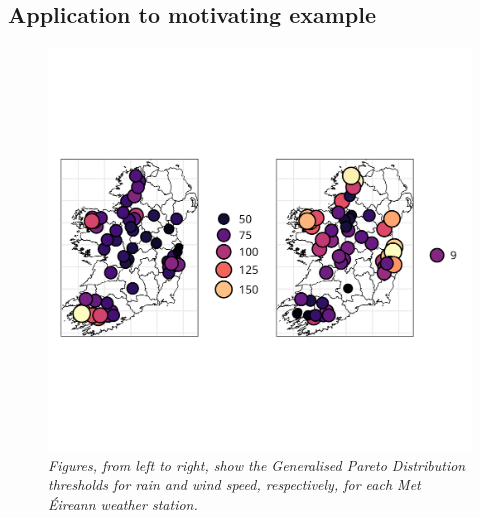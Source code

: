 \documentclass{article}
\numberwithin{equation}{section}
\begin{document}
\subsection{Application to motivating example} \label{subsec:uni_application}

\begin{figure}[H]
    \centering
    \includegraphics[width = 0.9\linewidth]{plots/031_thresh_plots.png}
    \caption{\emph{Figures, from left to right, show the Generalised Pareto Distribution thresholds for rain and wind speed, respectively, for each Met Éireann weather station.}}
    \label{fig:03_uni_thresh}
\end{figure}
\end{document}
